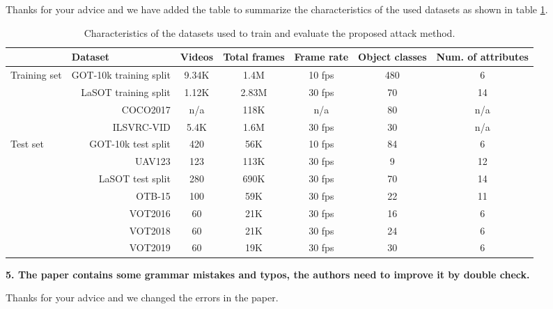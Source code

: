 \documentclass{article}
\begin{document}
Thanks for your advice and we have added the table to summarize the characteristics of the used datasets as shown in table \ref{tab:dataset}.
\begin{table}[h]
    \caption{Characteristics of the datasets used to train and evaluate the proposed attack method.}
    \begin{tabular}{lrccccc} \toprule
    \multicolumn{2}{c}{Dataset}                            & Videos & Total frames & Frame rate & Object classes & Num. of attributes \\ \midrule
    \multirow{4}{*}{Training set} & GOT-10k training split & 9.34K & 1.4M        & 10 fps     & 480            & 6                  \\
                                  & LaSOT training split   & 1.12K & 2.83M        & 30 fps     & 70             & 14                 \\
                                  & COCO2017               & n/a    & 118K         & n/a        & 80             & n/a                \\
                                  & ILSVRC-VID             & 5.4K  & 1.6M         & 30 fps     & 30             & n/a                \\ \midrule
    \multirow{7}{*}{Test set}     & GOT-10k test split     & 420    & 56K          & 10 fps     & 84             & 6                  \\
                                  & UAV123                 & 123    & 113K         & 30 fps     & 9              & 12                 \\
                                  & LaSOT test split       & 280    & 690K         & 30 fps     & 70             & 14                 \\
                                  & OTB-15                 & 100    & 59K          & 30 fps     & 22             & 11                 \\
                                  & VOT2016                & 60     & 21K          & 30 fps     & 16             & 6                  \\
                                  & VOT2018                & 60     & 21K          & 30 fps     & 24             & 6                  \\ 
                                  & VOT2019                & 60     & 19K          & 30 fps     & 30             & 6                  \\ \bottomrule
    \end{tabular}
    \label{tab:dataset}
\end{table}

\noindent \textbf{5. The paper contains some grammar mistakes and typos, the authors need to improve it by double check.}

Thanks for your advice and we changed the errors in the paper.



\end{document}
